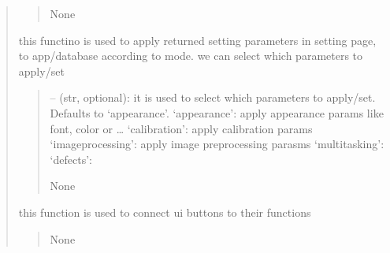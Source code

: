 \documentclass[letterpaper,10pt,english]{sphinxmanual}
\begin{document}
\begin{quote}
\begin{savenotes}
\begin{fulllineitems}
\begin{savenotes}
\begin{fulllineitems}
\begin{quote}
\begin{description}
\sphinxAtStartPar
None

\end{description}\end{quote}

\end{fulllineitems}\end{savenotes}


\begin{savenotes}\begin{fulllineitems}
\label{\detokenize{setting/setting_api:oxin.setting_api.API.apply_changed_appearance_params}}
\pysigstartsignatures
{}
\pysigstopsignatures
\sphinxAtStartPar
this functino is used to apply returned setting parameters in setting page, to app/database
according to mode. we can select which parameters to apply/set
\begin{quote}\begin{description}
\sphinxAtStartPar
{} – (str, optional): it is used to select which parameters to apply/set. Defaults to ‘appearance’.
‘appearance’: apply appearance params like font, color or …
‘calibration’: apply calibration params
‘imageprocessing’: apply image preprocessing parasms
‘multitasking’:
‘defects’:

\sphinxAtStartPar
None

\end{description}\end{quote}

\end{fulllineitems}\end{savenotes}


\begin{savenotes}\begin{fulllineitems}
\label{\detokenize{setting/setting_api:oxin.setting_api.API.button_connector}}
\pysigstartsignatures
{}
\pysigstopsignatures
\sphinxAtStartPar
this function is used to connect ui buttons to their functions
\begin{quote}\begin{description}
\sphinxAtStartPar
None


\end{description}
\end{quote}
\end{fulllineitems}
\end{savenotes}
\end{fulllineitems}
\end{savenotes}
\end{quote}
\end{document}
